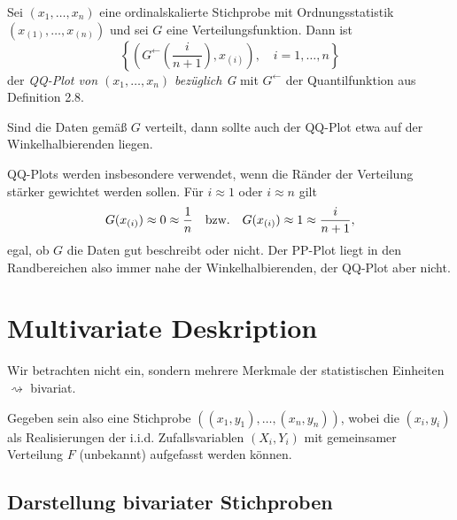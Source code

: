 \begin{defn} %
  Sei $(x_1, \ldots, x_n)$ eine ordinalskalierte Stichprobe mit
  Ordnungsstatistik $(x_{(1)}, \ldots, x_{(n)})$ und sei $G$ eine
  Verteilungsfunktion. Dann ist
  \[ \left\{ \left( G^{\leftarrow}\left( \frac{i}{n+1} \right), x_{(i)} \right),
      \quad i = 1, \ldots, n \right\} \]
  der \emph{QQ-Plot von $(x_1, \ldots, x_n)$ bezüglich G} mit $G^\leftarrow$ der
  Quantilfunktion aus Definition 2.8.
\end{defn}

Sind die Daten gemäß $G$ verteilt, dann sollte auch der QQ-Plot etwa auf der
Winkelhalbierenden liegen.

QQ-Plots werden insbesondere verwendet, wenn die Ränder der Verteilung stärker
gewichtet werden sollen. Für $i \approx 1$ oder $i \approx n$ gilt
\[ G(x_{(i)}) \approx 0 \approx \frac{1}{n} \quad \text{bzw.} \quad G(x_{(i)})
  \approx 1 \approx \frac{i}{n+1}, \]
egal, ob $G$ die Daten gut beschreibt oder nicht. Der PP-Plot liegt in den
Randbereichen also immer nahe der Winkelhalbierenden, der QQ-Plot aber nicht.

\section{Multivariate Deskription}
Wir betrachten nicht ein, sondern mehrere Merkmale der statistischen Einheiten
$\rightsquigarrow$ bivariat.

Gegeben sein also eine Stichprobe $((x_1, y_1), \ldots, (x_n,y_n))$, wobei die
$(x_i,y_i)$ als Realisierungen der i.i.d. Zufallsvariablen $(X_i,Y_i)$ mit
gemeinsamer Verteilung $F$ (unbekannt) aufgefasst werden können.

\subsection{Darstellung bivariater Stichproben}
